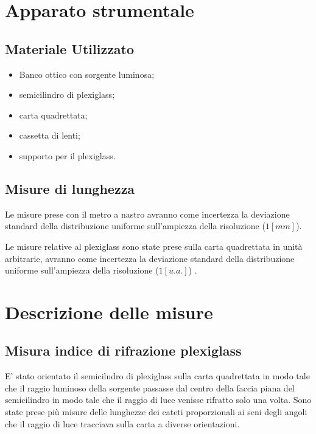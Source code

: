 \documentclass{article}
\begin{document}
 

\section{Apparato strumentale}


\subsection{Materiale Utilizzato}


\begin{itemize}

\item Banco ottico con sorgente luminosa;
\item semicilindro di plexiglass;
\item carta quadrettata;
\item cassetta di lenti;
\item supporto per il plexiglass.

\end{itemize} 

\subsection{Misure di lunghezza}

Le misure prese con il metro a nastro avranno come incertezza la deviazione standard della distribuzione uniforme sull'ampiezza della risoluzione ($1[mm]$).

Le misure relative al plexiglass sono state prese sulla carta quadrettata in unità arbitrarie, avranno come incertezza la deviazione standard della distribuzione uniforme sull'ampiezza della risoluzione ($1[u.a.]$) .

\section{Descrizione delle misure}

\subsection{Misura indice di rifrazione plexiglass}
 
E' stato orientato il semicilndro di plexiglass sulla carta quadrettata in modo tale che il raggio luminoso della sorgente passasse dal centro della faccia piana del semicilindro in modo tale che il raggio di luce venisse rifratto solo una volta. 
Sono state prese più misure delle lunghezze dei cateti proporzionali ai seni  degli angoli che il raggio di luce tracciava sulla carta a diverse orientazioni.
\end{document}
